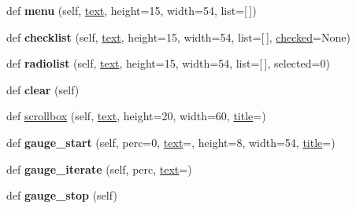 \begin{DoxyCompactItemize}
\item 
def {\bfseries menu} (self, \hyperlink{classdialog_1_1_dialog_ac6496479083764dc18d577e5becfa467}{text}, height=15, width=54, list=\mbox{[}$\,$\mbox{]})\hypertarget{classdialog_1_1_dialog_a46131ddc7cb61021ab8c9da76478f9c2}{}\label{classdialog_1_1_dialog_a46131ddc7cb61021ab8c9da76478f9c2}

\item 
def {\bfseries checklist} (self, \hyperlink{classdialog_1_1_dialog_ac6496479083764dc18d577e5becfa467}{text}, height=15, width=54, list=\mbox{[}$\,$\mbox{]}, \hyperlink{classdialog_1_1_dialog_a7aba8e996b51d4646719386b385eef67}{checked}=None)\hypertarget{classdialog_1_1_dialog_a38765497255e890acb0d1b31b8126582}{}\label{classdialog_1_1_dialog_a38765497255e890acb0d1b31b8126582}

\item 
def {\bfseries radiolist} (self, \hyperlink{classdialog_1_1_dialog_ac6496479083764dc18d577e5becfa467}{text}, height=15, width=54, list=\mbox{[}$\,$\mbox{]}, selected=0)\hypertarget{classdialog_1_1_dialog_ac766dc940a9cf16bcf557db0132d8b95}{}\label{classdialog_1_1_dialog_ac766dc940a9cf16bcf557db0132d8b95}

\item 
def {\bfseries clear} (self)\hypertarget{classdialog_1_1_dialog_adf058ea9fa1b2306158384b7fd7c5ab9}{}\label{classdialog_1_1_dialog_adf058ea9fa1b2306158384b7fd7c5ab9}

\item 
def \hyperlink{classdialog_1_1_dialog_a3ba71143419c416d94fce363f0d71d7b}{scrollbox} (self, \hyperlink{classdialog_1_1_dialog_ac6496479083764dc18d577e5becfa467}{text}, height=20, width=60, \hyperlink{classdialog_1_1_dialog_a0ba5ed1f2029a13c537ea89ace62176a}{title}=\textquotesingle{}\textquotesingle{})
\item 
def {\bfseries gauge\+\_\+start} (self, perc=0, \hyperlink{classdialog_1_1_dialog_ac6496479083764dc18d577e5becfa467}{text}=\textquotesingle{}\textquotesingle{}, height=8, width=54, \hyperlink{classdialog_1_1_dialog_a0ba5ed1f2029a13c537ea89ace62176a}{title}=\textquotesingle{}\textquotesingle{})\hypertarget{classdialog_1_1_dialog_afd9ebf35f1847d217802fbbc6d0bc994}{}\label{classdialog_1_1_dialog_afd9ebf35f1847d217802fbbc6d0bc994}

\item 
def {\bfseries gauge\+\_\+iterate} (self, perc, \hyperlink{classdialog_1_1_dialog_ac6496479083764dc18d577e5becfa467}{text}=\textquotesingle{}\textquotesingle{})\hypertarget{classdialog_1_1_dialog_aec7ea4560dfe2da7573be965ab4110eb}{}\label{classdialog_1_1_dialog_aec7ea4560dfe2da7573be965ab4110eb}

\item 
def {\bfseries gauge\+\_\+stop} (self)\hypertarget{classdialog_1_1_dialog_a49dc4284ebe8cc7a0db1aadbbbd2fe6c}{}\label{classdialog_1_1_dialog_a49dc4284ebe8cc7a0db1aadbbbd2fe6c}

\end{DoxyCompactItemize}
